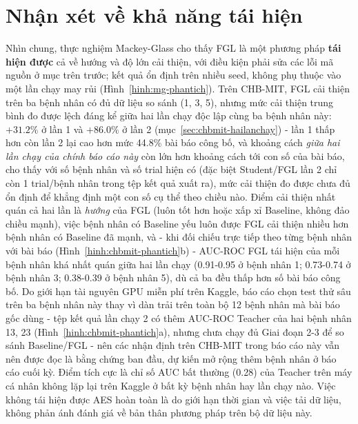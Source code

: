 \section{Nhận xét về khả năng tái hiện}

Nhìn chung, thực nghiệm Mackey-Glass cho thấy FGL là một phương pháp \textbf{tái hiện được}
cả về hướng và độ lớn cải thiện, với điều kiện phải sửa các lỗi mã nguồn ở mục trên trước; kết
quả ổn định trên nhiều seed, không phụ thuộc vào một lần chạy may rủi (Hình~\ref{hinh:mg-phantich}).
Trên CHB-MIT, FGL cải thiện trên ba bệnh nhân có đủ dữ liệu so sánh (1, 3, 5), nhưng mức cải
thiện trung bình đo được lệch đáng kể giữa hai lần chạy độc lập cùng ba bệnh nhân này:
$+31.2\%$ ở lần 1 và $+86.0\%$ ở lần 2 (mục~\ref{sec:chbmit-hailanchay}) - lần 1 thấp hơn còn
lần 2 lại cao hơn mức 44.8\% bài báo công bố, và khoảng cách \textit{giữa hai lần chạy của chính
báo cáo này} còn lớn hơn khoảng cách tới con số của bài báo, cho thấy với số bệnh nhân và số
trial hiện có (đặc biệt Student/FGL lần 2 chỉ còn 1 trial/bệnh nhân trong tệp kết quả xuất ra),
mức cải thiện đo được chưa đủ ổn định để khẳng định một con số cụ thể theo chiều nào. Điểm cải
thiện nhất quán cả hai lần là \textit{hướng} của FGL (luôn tốt hơn hoặc xấp xỉ Baseline, không
đảo chiều mạnh), việc bệnh nhân có Baseline yếu luôn được FGL cải thiện nhiều hơn bệnh nhân có
Baseline đã mạnh, và - khi đối chiếu trực tiếp theo từng bệnh nhân với bài báo
(Hình~\ref{hinh:chbmit-phantich}b) - AUC-ROC FGL tái hiện của mỗi bệnh nhân khá nhất quán giữa
hai lần chạy (0.91-0.95 ở bệnh nhân 1; 0.73-0.74 ở bệnh nhân 3; 0.38-0.39 ở bệnh nhân 5), dù cả
ba đều thấp hơn số bài báo công bố. Do giới hạn tài nguyên GPU miễn phí trên Kaggle, báo cáo
chọn test thử sâu trên ba bệnh nhân này thay vì dàn trải trên toàn bộ 12 bệnh nhân mà bài báo
gốc dùng - tệp kết quả lần chạy 2 có thêm AUC-ROC Teacher của hai bệnh nhân 13, 23
(Hình~\ref{hinh:chbmit-phantich}a), nhưng chưa chạy đủ Giai đoạn 2-3 để so sánh Baseline/FGL -
nên các nhận định trên CHB-MIT trong báo cáo này vẫn nên được đọc là bằng chứng ban đầu, dự
kiến mở rộng thêm bệnh nhân ở báo cáo cuối kỳ. Điểm tích cực là chỉ số AUC bất thường (0.28)
của Teacher trên máy cá nhân không lặp lại trên Kaggle ở bất kỳ bệnh nhân hay lần chạy nào.
Việc không tái hiện được AES hoàn toàn là do giới hạn thời gian và việc tải dữ liệu, không phản
ánh đánh giá về bản thân phương pháp trên bộ dữ liệu này.
